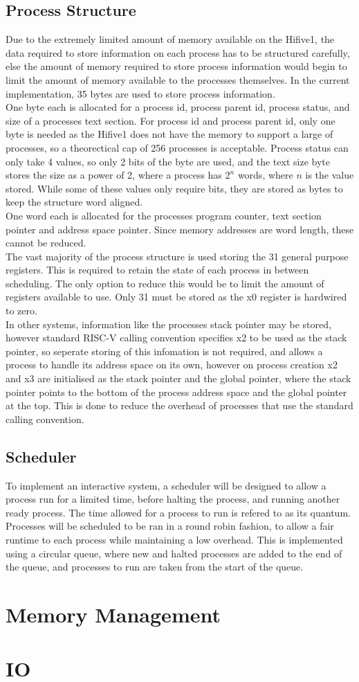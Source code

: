 \subsection{Process Structure}
Due to the extremely limited amount of memory available on the Hifive1, the data required to store information on each process has to be structured carefully, else the amount of memory required to store process information would begin to limit the amount of memory available to the processes themselves. In the current implementation, 35 bytes are used to store process information.
\\
One byte each is allocated for a process id, process parent id, process status, and size of a processes text section. For process id and process parent id, only one byte is needed as the Hifive1 does not have the memory to support a large of processes, so a theorectical cap of 256 processes is acceptable. Process status can only take 4 values, so only 2 bits of the byte are used, and the text size byte stores the size as a power of 2, where a process has \(2^n\) words, where \(n\) is the value stored. While some of these values only require bits, they are stored as bytes to keep the structure word aligned. 
\\
One word each is allocated for the processes program counter, text section pointer and address space pointer. Since memory addresses are word length, these cannot be reduced.
\\
The vast majority of the process structure is used storing the 31 general purpose registers. This is required to retain the state of each process in between scheduling. The only option to reduce this would be to limit the amount of registers available to use. Only 31 must be stored as the x0 register is hardwired to zero.
\\
In other systems, information like the processes stack pointer may be stored, however standard RISC-V calling convention specifies x2 to be used as the stack pointer, so seperate storing of this infomation is not required, and allows a process to handle its address space on its own, however on process creation x2 and x3 are initialised as the stack pointer and the global pointer, where the stack pointer points to the bottom of the process address space and the global pointer at the top. This is done to reduce the overhead of processes that use the standard calling convention.
\subsection{Scheduler}
To implement an interactive system, a scheduler will be designed to allow a process run for a limited time, before halting the process, and running another ready process. The time allowed for a process to run is refered to as its quantum. Processes will be scheduled to be ran in a round robin fashion, to allow a fair runtime to each process while maintaining a low overhead. This is implemented using a circular queue, where new and halted processes are added to the end of the queue, and processes to run are taken from the start of the queue.
\section{Memory Management}

\section{IO}